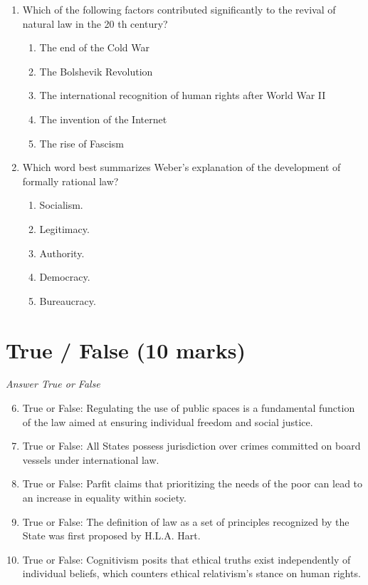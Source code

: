 \documentclass[12pt]{article}
\begin{document}
\begin{enumerate}[label=\arabic*.]
\begin{enumerate}[label=(\alph*)]
    \item The UK Constitution is based on a Bill of Rights
\end{enumerate}
\item Which of the following factors contributed significantly to the revival of natural law in the 20 th century?
\begin{enumerate}[label=(\alph*)]
    \item The end of the Cold War
    \item The Bolshevik Revolution
    \item The international recognition of human rights after World War II
    \item The invention of the Internet
    \item The rise of Fascism
\end{enumerate}
\item Which word best summarizes Weber's explanation of the development of formally rational law?
\begin{enumerate}[label=(\alph*)]
    \item Socialism.
    \item Legitimacy.
    \item Authority.
    \item Democracy.
    \item Bureaucracy.
\end{enumerate}
\end{enumerate}

\section*{True / False (10 marks)}
\textit{Answer True or False}
\begin{enumerate}[label=\arabic*.]
\setcounter{enumi}{5}
\item True or False: Regulating the use of public spaces is a fundamental function of the law aimed at ensuring individual freedom and social justice.
\item True or False: All States possess jurisdiction over crimes committed on board vessels under international law.
\item True or False: Parfit claims that prioritizing the needs of the poor can lead to an increase in equality within society.
\item True or False: The definition of law as a set of principles recognized by the State was first proposed by H.L.A. Hart.
\item True or False: Cognitivism posits that ethical truths exist independently of individual beliefs, which counters ethical relativism's stance on human rights.
\end{enumerate}
\end{document}

